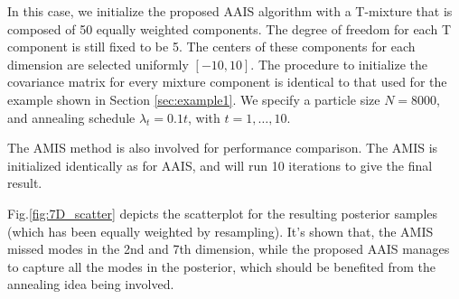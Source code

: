\documentclass[aoas]{imsart}
\begin{document}
In this case, we initialize the proposed AAIS algorithm with a
T-mixture that is composed of 50 equally weighted components. The
degree of freedom for each T component is still fixed to be 5. The
centers of these components for each dimension are selected
uniformly $[-10,10]$. The procedure to initialize the covariance
matrix for every mixture component is identical to that used for the
example shown in Section \ref{sec:example1}. We specify a particle
size $N=8000$, and annealing schedule $\lambda_t=0.1t$, with
$t=1,\ldots,10$.

The AMIS method \citep{cappe2008ais} is also involved for
performance comparison. The AMIS is initialized identically as for
AAIS, and will run 10 iterations to give the final result.

Fig.\ref{fig:7D_scatter} depicts the scatterplot for the resulting
posterior samples (which has been equally weighted by resampling).
It's shown that, the AMIS missed modes in the 2nd and 7th dimension,
while the proposed AAIS manages to capture all the modes in the
posterior, which should be benefited from the annealing idea being
involved.
\end{document}
